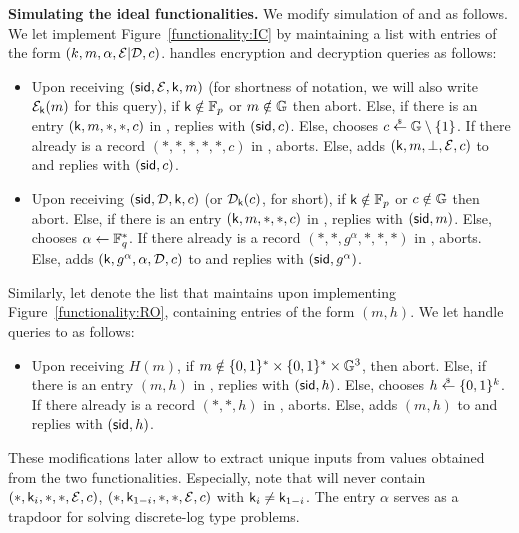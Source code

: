 \begin{games}
\textbf{Simulating the ideal functionalities.}
We modify simulation of \Fro and \Fic as follows. We let \Sim implement Figure~\ref{functionality:IC} by maintaining a list \ListIC with entries of the form $(k,m,\alpha,\mathcal{E}|\mathcal{D},c)$. \Sim handles encryption and decryption queries as follows:
\begin{itemize}
 \item Upon receiving $(\mathsf{sid},\mathcal{E},\mathsf{k},m)$ (for shortness of notation, we will also write $\mathcal{E}_{\mathsf{k}}(m)$ for this query), if $\mathsf{k}\notin \mathbb{F}_{p}$ or $m\notin \mathbb{G}$ then abort. Else, if there is an entry $(\mathsf{k},m,*,*,c)$ in \ListIC, \Sim replies with $(\mathsf{sid},c)$. Else, \Sim chooses $c\stackrel{{}_\$}{\leftarrow} \mathbb{G}\setminus\{1\}$. If there already is a record $(*,*,*,*,*,c)$ in \ListIC, \Sim aborts. Else, \Sim adds $(\mathsf{k},m,\bot,\mathcal{E},c)$ to \ListIC and replies with $(\mathsf{sid},c)$.
 \item Upon receiving $(\mathsf{sid},\mathcal{D},\mathsf{k},c)$ (or $\mathcal{D}_{\mathsf{k}}(c)$, for short), if $\mathsf{k}\notin \mathbb{F}_{p}$ or $c\notin \mathbb{G}$ then abort. Else, if there is an entry $(\mathsf{k},m,*,*,c)$ in \ListIC, \Sim replies with $(\mathsf{sid},m)$. Else, \Sim chooses $\alpha\gets \mathbb{F}_q^*$. If there already is a record $(*,*,g^\alpha,*,*,*)$ in \ListIC, \Sim aborts. Else, \Sim adds $(\mathsf{k},g^\alpha,\alpha,\mathcal{D},c)$ to \ListIC and replies with $(\mathsf{sid},g^\alpha)$.
\end{itemize} 
Similarly, let \ListRO denote the list that \Sim maintains upon implementing Figure~\ref{functionality:RO}, containing entries of the form $(m,h)$. We let \Sim handle queries to \Fro as follows:
\begin{itemize}
\item Upon receiving $H(m)$, if $m\notin \{0,1\}^*\times\{0,1\}^*\times\mathbb{G}^3$, then abort.
Else, if there is an entry $(m,h)$ in \ListRO, \Sim replies with $(\mathsf{sid},h)$. Else, \Sim chooses $h\stackrel{{}_\$}{\leftarrow} \{0,1\}^k$.
If there already is a record $(*,*,h)$ in \ListRO, \Sim aborts. Else, \Sim adds $(m,h)$ to \ListRO and replies with $(\mathsf{sid},h)$.
\end{itemize}

These modifications later allow \Sim to extract unique inputs from values obtained from the two functionalities. Especially, note that \ListIC will never contain $(*,\mathsf{k}_{i},*,*,\mathcal{E},c)$, $(*,\mathsf{k}_{1-i},*,*,\mathcal{E},c)$ with $\mathsf{k}_{i}\neq \mathsf{k}_{1-i}$. The entry $\alpha$ serves \Sim as a trapdoor for solving discrete-log type problems.


\end{games}
